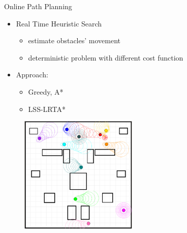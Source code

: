 \documentclass[xcolor=x11names,compress]{beamer}
\renewcommand{\(}{\begin{columns}}
\renewcommand{\)}{\end{columns}}
\newcommand{\<}[1]{\begin{column}{#1}}
\renewcommand{\>}{\end{column}}
\begin{document}

\begin{frame}{Online Path Planning}
\begin{itemize}
\item Real Time Heuristic Search
\begin{itemize}
\item estimate obstacles' movement
\item deterministic problem with different cost function
\end{itemize}
\pause
\item Approach:
\begin{itemize}
\item Greedy, A*
\item LSS-LRTA*
\end{itemize}
\end{itemize}
\begin{figure}
\centering
\includegraphics[width=0.5\textwidth]{./figures/rts.png}
\end{figure}
\end{frame}

\end{document}
